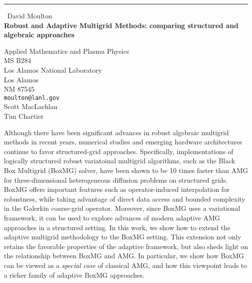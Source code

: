 \documentclass{report}
\begin{document}
\begin{center}
\rule{6in}{1pt} \
{\large David Moulton \\
{\bf Robust and Adaptive Multigrid Methods: comparing structured and algebraic approaches }}

Applied Mathematics and Plasma Physics \\ MS B284 \\ Los Alamos National Laboratory \\ Los Alamos \\ NM 87545
\\
{\tt moulton@lanl.gov}\\
Scott MacLachlan\\
Tim Chartier\end{center}

Although there have been significant advances in robust algebraic
multigrid methods in recent years, numerical studies and emerging
hardware architectures continue to favor structured-grid approaches.
Specifically, implementations of logically structured robust variatoinal
multigrid algorithms, such as the Black Box Multigrid (BoxMG) solver,
have been shown to be 10 times faster than AMG for three-dimensional
heterogeneous diffusion problems on structured grids. BoxMG offers
important features such as operator-induced interpolation for robustness,
while taking advantage of direct data access and bounded complexity in
the Galerkin coarse-grid operator. Moreover, since BoxMG uses a
variational framework, it can be used to explore advances of modern
adaptive AMG approaches in a structured setting. In this work, we show
how to extend the adaptive multigrid methodology to the BoxMG setting.
This extension not only retains the favorable properties of the adaptive
framework, but also sheds light on the relationship between BoxMG and
AMG. In particular, we show how BoxMG can be viewed as a \emph{special
case} of classical AMG, and how this viewpoint leads to a richer family
of adaptive BoxMG approaches.
\end{document}
